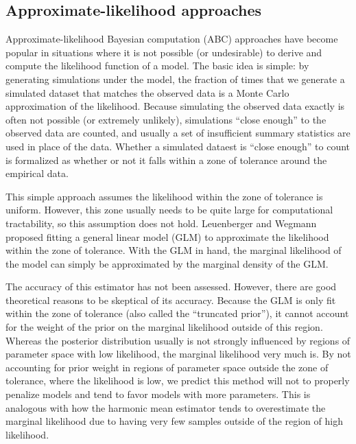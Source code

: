 \subsection{Approximate-likelihood approaches}

Approximate-likelihood Bayesian computation (ABC) approaches
\citep{Tavare1997,Beaumont2002} have become popular in situations where it is
not possible (or undesirable) to derive and compute the likelihood function of
a model.
The basic idea is simple: by generating simulations under the model, the
fraction of times that we generate a simulated dataset that matches the
observed data is a Monte Carlo approximation of the likelihood.
Because simulating the observed data exactly is often not possible (or extremely
unlikely), simulations ``close enough'' to the observed data are
counted, and usually a set of insufficient summary statistics are used in place
of the data.
Whether a simulated dataest is ``close enough'' to count is formalized as
whether or not it falls within a zone of tolerance around the empirical data.

This simple approach assumes the likelihood within the zone of tolerance is
uniform.
However, this zone usually needs to be quite large for computational
tractability, so this assumption does not hold.
Leuenberger and Wegmann \citep{Leuenberger2010} proposed fitting a general
linear model (GLM) to approximate the likelihood within the zone of tolerance.
With the GLM in hand, the marginal likelihood of the model can simply be
approximated by the marginal density of the GLM.

The accuracy of this estimator has not been assessed.
However, there are good theoretical reasons to be skeptical of its accuracy.
Because the GLM is only fit within the zone of tolerance (also called the
``truncated prior''), it cannot account for the weight of the prior on the
marginal likelihood outside of this region.
Whereas the posterior distribution usually is not strongly influenced by
regions of parameter space with low likelihood, the marginal likelihood very
much is.
By not accounting for prior weight in regions of parameter space outside the
zone of tolerance, where the likelihood is low, we predict this method will not
to properly penalize models and tend to favor models with more parameters.
This is analogous with how the harmonic mean estimator tends to overestimate
the marginal likelihood due to having very few samples outside of the region of
high likelihood.

